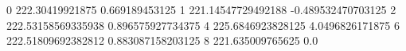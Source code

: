 0 222.30419921875 0.669189453125
1 221.14547729492188 -0.489532470703125
2 222.53158569335938 0.896575927734375
4 225.6846923828125 4.0496826171875
6 222.51809692382812 0.883087158203125
8 221.635009765625 0.0
